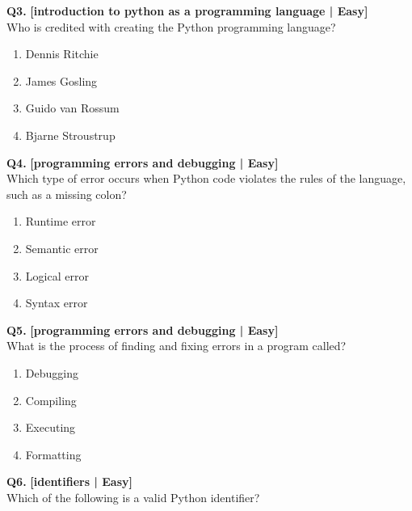 \noindent\textbf{Q3.} \hfill {\small\color{LPUOrange}\textbf{[introduction to python as a programming language | Easy]}}\\[2pt]
Who is credited with creating the Python programming language?

\begin{enumerate}[label=(\alph*),topsep=2pt,itemsep=1pt,partopsep=0pt,parsep=0pt]
    \item \relax Dennis Ritchie
    \item \relax James Gosling
    \item \relax Guido van Rossum
    \item \relax Bjarne Stroustrup
\end{enumerate}
\vspace{2mm}

\noindent\textbf{Q4.} \hfill {\small\color{LPUOrange}\textbf{[programming errors and debugging | Easy]}}\\[2pt]
Which type of error occurs when Python code violates the rules of the language, such as a missing colon?

\begin{enumerate}[label=(\alph*),topsep=2pt,itemsep=1pt,partopsep=0pt,parsep=0pt]
    \item \relax Runtime error
    \item \relax Semantic error
    \item \relax Logical error
    \item \relax Syntax error
\end{enumerate}
\vspace{2mm}

\noindent\textbf{Q5.} \hfill {\small\color{LPUOrange}\textbf{[programming errors and debugging | Easy]}}\\[2pt]
What is the process of finding and fixing errors in a program called?

\begin{enumerate}[label=(\alph*),topsep=2pt,itemsep=1pt,partopsep=0pt,parsep=0pt]
    \item \relax Debugging
    \item \relax Compiling
    \item \relax Executing
    \item \relax Formatting
\end{enumerate}
\vspace{2mm}

\noindent\textbf{Q6.} \hfill {\small\color{LPUOrange}\textbf{[identifiers | Easy]}}\\[2pt]
Which of the following is a valid Python identifier?

